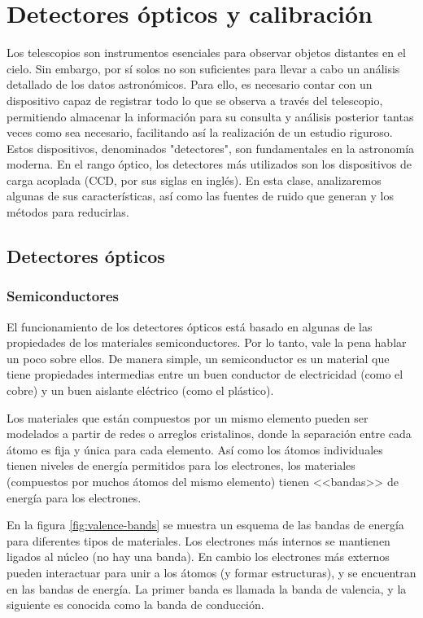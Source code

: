 \chapter{Detectores ópticos y calibración}
Los telescopios son instrumentos esenciales para observar objetos distantes en el cielo. Sin embargo, por sí solos no son suficientes para llevar a cabo un análisis detallado de los datos astronómicos. Para ello, es necesario contar con un dispositivo capaz de registrar todo lo que se observa a través del telescopio, permitiendo almacenar la información para su consulta y análisis posterior tantas veces como sea necesario, facilitando así la realización de un estudio riguroso. Estos dispositivos, denominados "detectores", son fundamentales en la astronomía moderna. En el rango óptico, los detectores más utilizados son los dispositivos de carga acoplada (CCD, por sus siglas en inglés). En esta clase, analizaremos algunas de sus características, así como las fuentes de ruido que generan y los métodos para reducirlas.


\section{Detectores ópticos}

\subsection{Semiconductores}
El funcionamiento de los detectores ópticos está basado en algunas de las propiedades de los materiales semiconductores. Por lo tanto, vale la pena hablar un poco sobre ellos. De manera simple, un semiconductor es un material que tiene propiedades intermedias entre un buen conductor de electricidad (como el cobre) y un buen aislante eléctrico (como el plástico). 

Los materiales que están compuestos por un mismo elemento pueden ser modelados a partir de redes o arreglos cristalinos, donde la separación entre cada átomo es fija y única para cada elemento. Así como los átomos individuales tienen niveles de energía permitidos para los electrones, los materiales (compuestos por muchos átomos del mismo elemento) tienen <<bandas>> de energía para los electrones. 

En la figura \ref{fig:valence-bands} se muestra un esquema de las bandas de energía para diferentes tipos de materiales. Los electrones más internos se mantienen ligados al núcleo (no hay una banda). En cambio los electrones más externos pueden interactuar para unir a los átomos (y formar estructuras), y se encuentran en las bandas de energía. La primer banda es llamada la banda de valencia, y la siguiente es conocida como la banda de conducción. 


